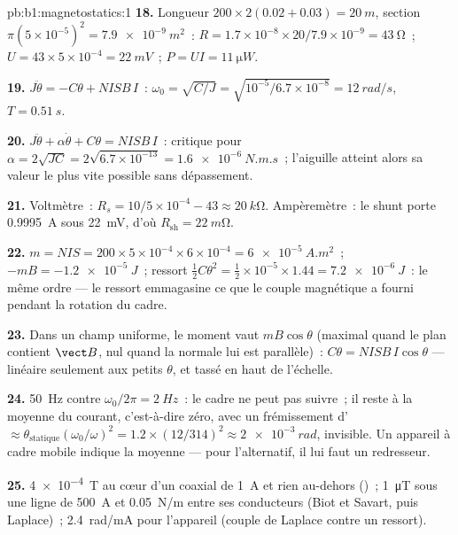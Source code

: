 \begin{solution}{pb:b1:magnetostatics:1}
\textbf{18.} Longueur $200 \times 2(0.02 + 0.03) = \qty{20}{m}$, section $\pi(5 \times
10^{-5})^2 = \qty{7.9e-9}{m^2}$~: $R = 1.7 \times 10^{-8} \times 20/7.9 \times 10^{-9} =
\qty{43}{\ohm}$~; $U = 43 \times 5 \times 10^{-4} = \qty{22}{mV}$~; $P = UI = \qty{11}{\micro W}$.

\textbf{19.} $J\ddot\theta = -C\theta + NISB\,I$~: $\omega_0 = \sqrt{C/J} = \sqrt{10^{-5}/6.7
\times 10^{-8}} = \qty{12}{rad/s}$, $T = \qty{0.51}{s}$.

\textbf{20.} $J\ddot\theta + \alpha\dot\theta + C\theta = NISB\,I$~: critique pour
$\alpha = 2\sqrt{JC} = 2\sqrt{6.7 \times 10^{-13}} = \qty{1.6e-6}{N.m.s}$~; l'aiguille
atteint alors sa valeur le plus vite possible sans dépassement.

\textbf{21.} Voltmètre~: $R_s = 10/5 \times 10^{-4} - 43 \approx \qty{20}{k\ohm}$.
Ampèremètre~: le shunt porte \qty{0.9995}{A} sous \qty{22}{mV}, d'où $R_{\text{sh}} =
\qty{22}{m\ohm}$.

\textbf{22.} $m = NIS = 200 \times 5 \times 10^{-4} \times 6 \times 10^{-4} = \qty{6e-5}{A.m^2}$~;
$-mB = \qty{-1.2e-5}{J}$~; ressort $\tfrac12C\theta^2 = \tfrac12 \times 10^{-5} \times 1.44 =
\qty{7.2e-6}{J}$~: le même ordre --- le ressort emmagasine ce que le couple
magnétique a fourni pendant la rotation du cadre.

\textbf{23.} Dans un champ uniforme, le moment vaut $mB\cos\theta$ (maximal quand
le plan contient $\vect B$, nul quand la normale lui est parallèle)~: $C\theta =
NISB\,I\cos\theta$ --- linéaire seulement aux petits $\theta$, et tassé en haut
de l'échelle.

\textbf{24.} \qty{50}{Hz} contre $\omega_0/2\pi = \qty{2}{Hz}$~: le cadre ne peut
pas suivre~; il reste à la moyenne du courant, c'est-à-dire zéro, avec un
frémissement d' $\approx \theta_{\text{statique}}(\omega_0/\omega)^2 = 1.2 \times (12/314)^2 \approx
\qty{2e-3}{rad}$, invisible. Un appareil à cadre mobile indique la moyenne ---
pour l'alternatif, il lui faut un redresseur.

\textbf{25.} \qty{4e-4}{T} au cœur d'un coaxial de \qty{1}{A} et rien au-dehors
()~; \qty{1}{\micro T} sous une ligne de \qty{500}{A} et
\qty{0.05}{N/m} entre ses conducteurs (Biot et Savart, puis Laplace)~;
\qty{2.4}{rad/mA} pour l'appareil (couple de Laplace contre un ressort).
\end{solution}
